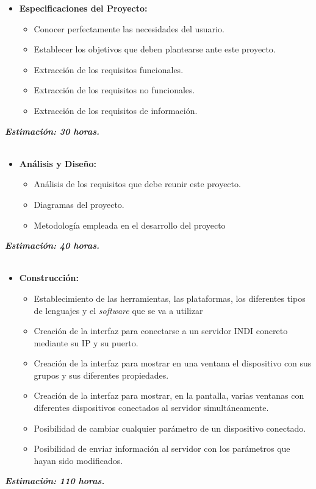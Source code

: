 \begin{itemize}
  \item \textbf{Especificaciones del Proyecto:}
  \begin{itemize}
    \item Conocer perfectamente las necesidades del usuario.
    \item Establecer los objetivos que deben plantearse ante este proyecto.
    \item Extracción de los requisitos funcionales.
    \item Extracción de los requisitos no funcionales.
    \item Extracción de los requisitos de información.
  \end{itemize}
\end{itemize}
\textit{\textbf{Estimación: 30 horas.}}\\ \\

\begin{itemize}
  \item \textbf{Análisis y Diseño:}
  \begin{itemize}
    \item Análisis de los requisitos que debe reunir este proyecto.
    \item Diagramas del proyecto.
    \item Metodología empleada en el desarrollo del proyecto
  \end{itemize}
\end{itemize}
\textit{\textbf{Estimación: 40 horas.}}\\ \\

\begin{itemize}
  \item \textbf{Construcción:}
  \begin{itemize}
    \item Establecimiento de las herramientas, las plataformas, los diferentes tipos de lenguajes y el \textit{software} que se va a utilizar
    \item Creación de la interfaz para conectarse a un servidor INDI concreto mediante su IP y su puerto.
    \item Creación de la interfaz para mostrar en una ventana el dispositivo con sus grupos y sus diferentes propiedades.
    \item Creación de la interfaz para mostrar, en la pantalla, varias ventanas con diferentes dispositivos conectados al servidor simultáneamente.
    \item Posibilidad de cambiar cualquier parámetro de un dispositivo conectado.
    \item Posibilidad de enviar información al servidor con los parámetros que hayan sido modificados.
  \end{itemize}
\end{itemize}
\textit{\textbf{Estimación: 110 horas.}}\\ \\

